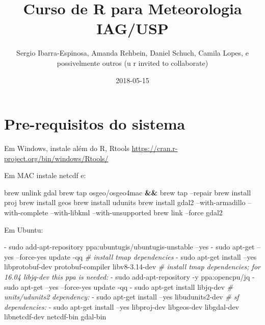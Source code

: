 \documentclass[]{book}
\title{Curso de R para Meteorologia IAG/USP}
\author{Sergio Ibarra-Espinosa, Amanda Rehbein, Daniel Schuch, Camila Lopes, e
possivelmente outros (u r invited to collaborate)}
\date{2018-05-15}
\newenvironment{Shaded}{\begin{snugshade}}{\end{snugshade}}
\newcommand{\KeywordTok}[1]{\textcolor[rgb]{0.13,0.29,0.53}{\textbf{#1}}}
\newcommand{\CommentTok}[1]{\textcolor[rgb]{0.56,0.35,0.01}{\textit{#1}}}
\newcommand{\ExtensionTok}[1]{#1}
\newcommand{\NormalTok}[1]{#1}
\begin{document}
\maketitle

{
\setcounter{tocdepth}{1}
\tableofcontents
}
\chapter{Pre-requisitos do sistema}\label{primero}

Em Windows, instale além do R, Rtools
\url{https://cran.r-project.org/bin/windows/Rtools/}

Em MAC instale netcdf e:

\begin{Shaded}
\begin{Highlighting}[]
\ExtensionTok{brew}\NormalTok{ unlink gdal}
\ExtensionTok{brew}\NormalTok{ tap osgeo/osgeo4mac }\KeywordTok{&&} \ExtensionTok{brew}\NormalTok{ tap --repair}
\ExtensionTok{brew}\NormalTok{ install proj}
\ExtensionTok{brew}\NormalTok{ install geos}
\ExtensionTok{brew}\NormalTok{ install udunits}
\ExtensionTok{brew}\NormalTok{ install gdal2 --with-armadillo --with-complete --with-libkml --with-unsupported}
\ExtensionTok{brew}\NormalTok{ link --force gdal2}
\end{Highlighting}
\end{Shaded}

Em Ubuntu:

\begin{Shaded}
\begin{Highlighting}[]
  \ExtensionTok{-}\NormalTok{ sudo add-apt-repository ppa:ubuntugis/ubuntugis-unstable --yes}
  \ExtensionTok{-}\NormalTok{ sudo apt-get --yes --force-yes update -qq}
  \CommentTok{# install tmap dependencies}
  \ExtensionTok{-}\NormalTok{ sudo apt-get install --yes libprotobuf-dev protobuf-compiler libv8-3.14-dev}
  \CommentTok{# install tmap dependencies; for 16.04 libjq-dev this ppa is needed:}
  \ExtensionTok{-}\NormalTok{ sudo add-apt-repository -y ppa:opencpu/jq}
  \ExtensionTok{-}\NormalTok{ sudo apt-get --yes --force-yes update -qq}
  \ExtensionTok{-}\NormalTok{ sudo apt-get install libjq-dev}
  \CommentTok{# units/udunits2 dependency:}
  \ExtensionTok{-}\NormalTok{ sudo apt-get install --yes libudunits2-dev}
  \CommentTok{# sf dependencies:}
  \ExtensionTok{-}\NormalTok{ sudo apt-get install --yes libproj-dev libgeos-dev libgdal-dev libnetcdf-dev  netcdf-bin gdal-bin}
\end{Highlighting}
\end{Shaded}
\end{document}
